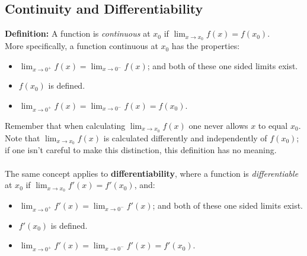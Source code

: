 \documentclass{report}
\begin{document}
\subsection{Continuity and Differentiability} %
\textbf{Definition:} A function is \textit{continuous} at $x_0$ if $\lim_{x\to x_0}f(x)=f(x_0)$.\\
More specifically, a function continuous at $x_0$ has the properties:
\begin{itemize}
\item $\lim_{x\to 0^+}f(x)=\lim_{x\to 0^-}f(x)$; and both of these one sided limits exist. 
\item $f(x_0)$ is defined.
\item $\lim_{x\to 0^+}f(x)=\lim_{x\to 0^-}f(x)=f(x_0)$.
\end{itemize}
Remember that when calculating $\lim_{x\to x_0}f(x)$ one never allows
$x$ to equal $x_0$. Note that $\lim_{x\to x_0}f(x)$ is calculated differently and independently
of $f(x_0)$; if one isn't careful to make this distinction, this definition has no meaning.\\
\vspace{2mm}\\
The same concept applies to \textbf{differentiability}, where a function is
\textit{differentiable} at $x_0$ if $\lim_{x\to x_0}f'(x)=f'(x_0)$, and:
\begin{itemize}
\item $\lim_{x\to 0^+}f'(x)=\lim_{x\to 0^-}f'(x)$; and both of these one sided limits exist. 
\item $f'(x_0)$ is defined.
\item $\lim_{x\to 0^+}f'(x)=\lim_{x\to 0^-}f'(x)=f'(x_0)$.
\end{itemize}
\end{document}

